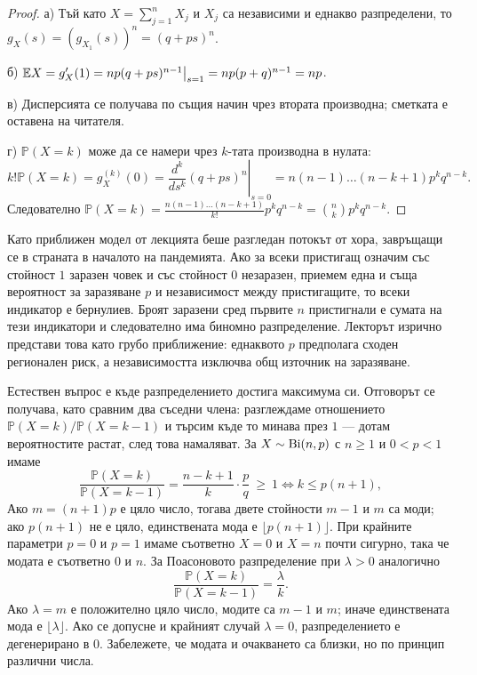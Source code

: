 \begin{proof}
а) Тъй като $X = \sum_{j=1}^n X_j$ и $X_j$ са независими и еднакво разпределени, то $g_X(s) = (g_{X_1}(s))^n = (q+ps)^n$.

б) $\mathbb{E} X = g_X'(1) = np(q+ps)^{n-1} \big|_{s=1} = np(p+q)^{n-1} = np$.

в) Дисперсията се получава по същия начин чрез втората производна; сметката е оставена на читателя.

г) $\mathbb{P}(X=k)$ може да се намери чрез $k$-тата производна в нулата:
\[ k! \mathbb{P}(X=k) = g_X^{(k)}(0) = \left. \frac{d^k}{ds^k} (q+ps)^n \right|_{s=0} = n(n-1)\dots(n-k+1) p^k q^{n-k}. \]
Следователно $\mathbb{P}(X=k) = \frac{n(n-1)\dots(n-k+1)}{k!} p^k q^{n-k} = \binom{n}{k} p^k q^{n-k}$.
\end{proof}

Като приближен модел от лекцията беше разгледан потокът от хора, завръщащи се в страната в началото на пандемията. Ако за всеки пристигащ означим със стойност $1$ заразен човек и със стойност $0$ незаразен, приемем една и съща вероятност за заразяване $p$ и независимост между пристигащите, то всеки индикатор е бернулиев. Броят заразени сред първите $n$ пристигнали е сумата на тези индикатори и следователно има биномно разпределение. Лекторът изрично представи това като грубо приближение: еднаквото $p$ предполага сходен регионален риск, а независимостта изключва общ източник на заразяване.

\begin{supp}\label{supp:mode}
Естествен въпрос е къде разпределението достига максимума си. Отговорът се получава, като
сравним два съседни члена: разглеждаме отношението $\mathbb{P}(X=k)/\mathbb{P}(X=k-1)$ и
търсим къде то минава през $1$ — дотам вероятностите растат, след това намаляват.
За $X\sim\operatorname{Bi}(n,p)$ с $n\ge1$ и $0<p<1$ имаме
\[
\frac{\mathbb{P}(X=k)}{\mathbb{P}(X=k-1)} = \frac{n-k+1}{k}\cdot\frac{p}{q} \ \ge\ 1
\iff k \le p(n+1),
\]
Ако $m=(n+1)p$ е цяло число, тогава двете стойности $m-1$ и $m$ са моди;
ако $p(n+1)$ не е цяло, единствената мода е $\lfloor p(n+1)\rfloor$.
При крайните параметри $p=0$ и $p=1$ имаме съответно $X=0$ и $X=n$ почти сигурно,
така че модата е съответно $0$ и $n$.
За Поасоновото разпределение при $\lambda>0$ аналогично
\[
\frac{\mathbb{P}(X=k)}{\mathbb{P}(X=k-1)}=\frac{\lambda}{k}.
\]
Ако $\lambda=m$ е положително цяло число, модите са $m-1$ и $m$;
иначе единствената мода е $\lfloor\lambda\rfloor$. Ако се допусне и крайният случай
$\lambda=0$, разпределението е дегенерирано в $0$. Забележете, че модата и очакването са
близки, но по принцип различни числа.
\end{supp}

